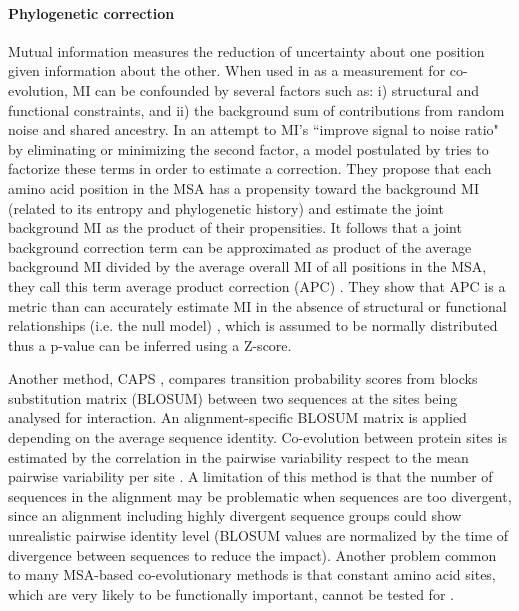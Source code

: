 \paragraph{Phylogenetic correction}
Mutual information measures the reduction of uncertainty about one position given information about the other.
When used in as a measurement for co-evolution, MI can be confounded by several factors such as: 
i) structural and functional constraints, and 
ii) the background sum of contributions from random noise and shared ancestry.
In an attempt to MI's ``improve signal to noise ratio" by eliminating or minimizing the second factor, a model postulated by \cite{dunn2008mutual} tries to factorize these terms in order to estimate a correction.
They propose that each amino acid position in the MSA has a propensity toward the background MI (related to its entropy and phylogenetic history) and estimate the joint background MI as the product of their propensities.
It follows that a joint background correction term can be approximated as product of the average background MI divided by the average overall MI of all positions in the MSA, they call this term average product correction (APC) \cite{dunn2008mutual}.
They show that APC is a metric than can accurately estimate MI in the absence of structural or functional relationships (i.e. the null model) \cite{dunn2008mutual}, which is assumed to be normally distributed thus a p-value can be inferred using a Z-score.

Another method, CAPS \cite{fares2006novel}, compares transition probability scores from blocks substitution matrix (BLOSUM) between two sequences at the sites being analysed for interaction.
An alignment-specific BLOSUM matrix is applied depending on the average sequence identity.
Co-evolution between protein sites is estimated by the correlation in the pairwise variability respect to the mean pairwise variability per site \cite{fares2006novel}.
A limitation of this method is that the number of sequences in the alignment may be problematic when sequences are too divergent, since an alignment including highly divergent sequence groups could show unrealistic pairwise identity level (BLOSUM values are normalized by the time of divergence between sequences to reduce the impact).
Another problem common to many MSA-based co-evolutionary methods is that constant amino acid sites, which are very likely to be functionally important, cannot be tested for  \cite{fares2006novel}.

